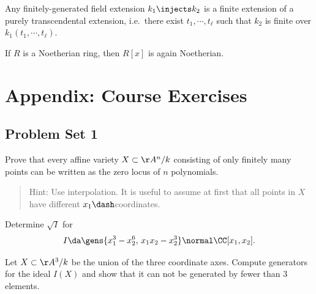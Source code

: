 \begin{theorem}\label{thm:noether_normalization}

Any finitely-generated field extension \(k_1 \injects k_2\) is a finite
extension of a purely transcendental extension, i.e.~there exist
\(t_1, \cdots, t_\ell\) such that \(k_2\) is finite over
\(k_1(t_1, \cdots, t_\ell)\).

\end{theorem}

\begin{theorem}\label{thm:hilbert_basis}

If \(R\) is a Noetherian ring, then \(R[x]\) is again Noetherian.

\end{theorem}

\hypertarget{appendix-course-exercises}{%
\section{Appendix: Course Exercises}\label{appendix-course-exercises}}

\hypertarget{problem-set-1}{%
\subsection{Problem Set 1}\label{problem-set-1}}

\begin{exercise}[Gathmann 1.19]

Prove that every affine variety \(X\subset \AA^n/k\) consisting of only
finitely many points can be written as the zero locus of \(n\)
polynomials.

\begin{quote}
Hint: Use interpolation. It is useful to assume at first that all points
in \(X\) have different \(x_1\dash\)coordinates.
\end{quote}

\end{exercise}

\begin{exercise}[Gathmann 1.21]

Determine \(\sqrt{I}\) for
\begin{align*}  
I\da \gens{x_1^3 - x_2^6,\, x_1 x_2 - x_2^3} \normal \CC[x_1, x_2]
.\end{align*}

\end{exercise}

\begin{exercise}[Gathmann 1.22]

Let \(X\subset \AA^3/k\) be the union of the three coordinate axes.
Compute generators for the ideal \(I(X)\) and show that it can not be
generated by fewer than 3 elements.

\end{exercise}

